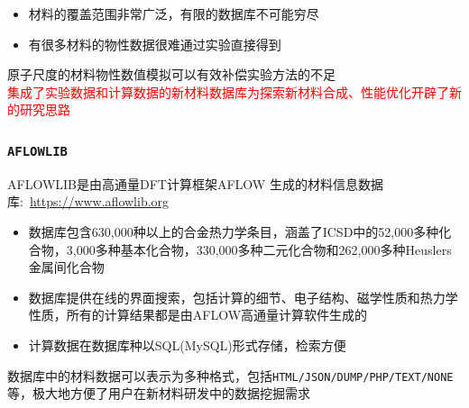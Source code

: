 {{{%
\begin{itemize}
	\item 材料的覆盖范围非常广泛，有限的数据库不可能穷尽%
	\item 有很多材料的物性数据很难通过实验直接得到
\end{itemize}

原子尺度的材料物性数值模拟可以有效补偿实验方法的不足\\
\textcolor{red}{集成了实验数据和计算数据的新材料数据库为探索新材料合成、性能优化开辟了新的研究思路}

}

\frame
{
\frametitle{\tt{AFLOWLIB}}
\textrm{AFLOWLIB}是由高通量\textrm{DFT}计算框架\textrm{AFLOW}%
生成的材料信息数据库:~\url{https://www.aflowlib.org}
\vskip 3pt
{\fontsize{7.5pt}{4.2pt}}%
\begin{itemize}
	\item 数据库包含\textrm{630,000}种以上的合金热力学条目，涵盖了\textrm{ICSD}中的\textrm{52,000}多种化合物，\textrm{3,000}多种基本化合物，\textrm{330,000}多种二元化合物和\textrm{262,000}多种\textrm{Heuslers}金属间化合物
	\item 数据库提供在线的界面搜索，包括计算的细节、电子结构、磁学性质和热力学性质，所有的计算结果都是由\textrm{AFLOW}高通量计算软件生成的
	\item 计算数据在数据库种以\textrm{SQL}(\textrm{MySQL})形式存储，检索方便
		\vskip 2pt
		{\fontsize{7.5pt}{4.2pt}}%
\end{itemize}
数据库中的材料数据可以表示为多种格式，包括\texttt{HTML/JSON/DUMP/PHP/TEXT/NONE}等，极大地方便了用户在新材料研发中的数据挖掘需求
}

}}
